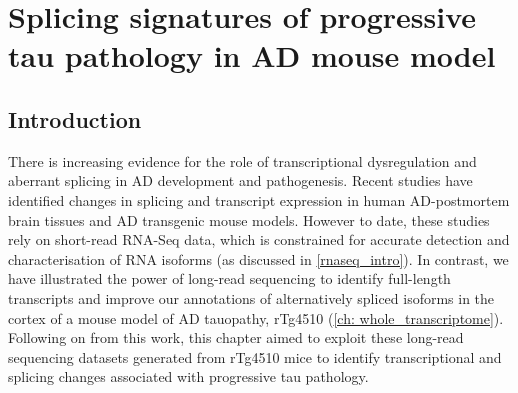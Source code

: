 \chapter{Splicing signatures of progressive tau pathology in AD mouse model}\label{ch: transcriptional_global_differences}

\section{Introduction}
There is increasing evidence for the role of transcriptional dysregulation and aberrant splicing in AD development and pathogenesis. Recent studies have identified changes in splicing and transcript expression in human AD-postmortem brain tissues and AD transgenic mouse models. However to date, these studies rely on short-read RNA-Seq data, which is constrained for accurate detection and characterisation of RNA isoforms (as discussed in \cref{rnaseq_intro}). In contrast, we have illustrated the power of long-read sequencing to identify full-length transcripts and improve our annotations of alternatively spliced isoforms in the cortex of a mouse model of AD tauopathy, rTg4510 (\cref{ch: whole_transcriptome}). Following on from this work, this chapter aimed to exploit these long-read sequencing datasets generated from rTg4510 mice to identify transcriptional and splicing changes associated with progressive tau pathology.  





